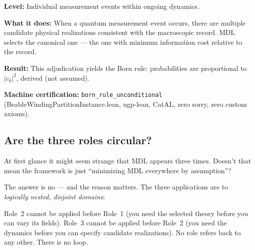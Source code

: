 \documentclass[11pt,a4paper]{article}
\newcommand{\lean}[1]{\texttt{#1}}
\begin{document}
\textbf{Level:} Individual measurement events within ongoing dynamics.

\textbf{What it does:} When a quantum measurement event occurs, there are multiple
candidate physical realizations consistent with the macroscopic record.  MDL selects
the canonical one — the one with minimum information cost relative to the record.

\textbf{Result:} This adjudication yields the Born rule: probabilities are proportional
to $|c_k|^2$, derived (not assumed).

\textbf{Machine certification:} \lean{born\_rule\_unconditional}
(BeableWindingPartitionInstance.lean, ugp-lean, CatAL, zero sorry, zero custom axioms).

\subsection{Are the three roles circular?}

At first glance it might seem strange that MDL appears three times.  Doesn't that mean
the framework is just ``minimizing MDL everywhere by assumption''?

The answer is no — and the reason matters.  The three applications are to
\emph{logically nested, disjoint domains}:

\begin{center}
\end{center}

Role~2 cannot be applied before Role~1 (you need the selected theory before you can
vary its fields).  Role~3 cannot be applied before Role~2 (you need the dynamics
before you can specify candidate realizations).  No role refers back to any other.
There is no loop.
\end{document}

